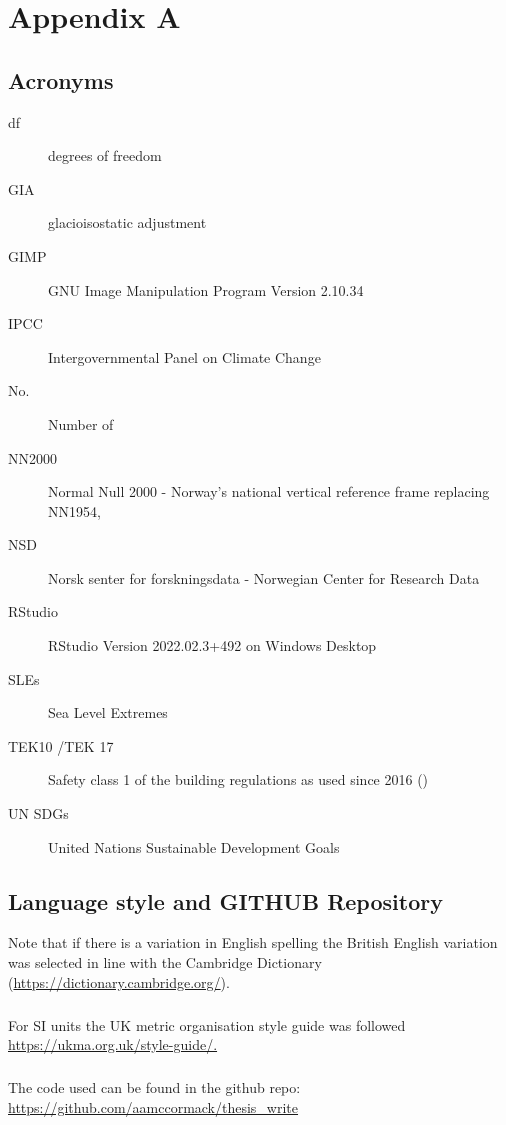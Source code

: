 
\chapter{Appendix A}
\section{Acronyms}
\begin{description}
\item[df]degrees of freedom
\item[GIA] glacioisostatic adjustment
\item[GIMP] GNU Image Manipulation Program Version 2.10.34
\item[IPCC] Intergovernmental Panel on Climate Change 
\item[No.] Number of
\item[NN2000] Normal Null 2000 - Norway's national vertical reference frame replacing NN1954, 
\item[NSD] Norsk senter for forskningsdata - Norwegian Center for Research Data
\item [RStudio] RStudio Version 2022.02.3+492 on Windows Desktop
\item[SLEs] Sea Level Extremes
\item[TEK10 /TEK 17] Safety class 1 of the building regulations as used since 2016 (\cite{tides_high_2022})
\item [UN SDGs] United Nations Sustainable Development Goals 
\end{description}

\section{Language style and GITHUB Repository}
Note that if there is a variation in English spelling the British English variation was selected in line with the Cambridge Dictionary (\url{https://dictionary.cambridge.org/}). 
\paragraph{}
For SI units the UK metric organisation style guide was followed \url{https://ukma.org.uk/style-guide/.}  
\paragraph{}
The code used can be found in the github repo: 
\url{ https://github.com/aamccormack/thesis_write}